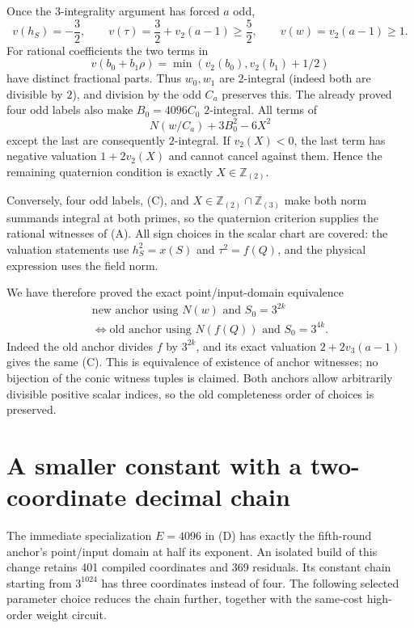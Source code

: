 Once the $3$-integrality argument has forced $a$ odd,
\[
 v(h_S)=-\frac32,\qquad
 v(\tau)=\frac32+v_2(a-1)\ge\frac52,
 \qquad v(w)=v_2(a-1)\ge1.
\]
For rational coefficients the two terms in
\[
 v(b_0+b_1\rho)=\min(v_2(b_0),v_2(b_1)+1/2)
\]
have distinct fractional parts. Thus $w_0,w_1$ are $2$-integral
(indeed both are divisible by $2$), and division by the odd $C_a$
preserves this. The already proved four odd labels also make
$B_0=4096C_0$ $2$-integral. All terms of
\[
 N(w/C_a)+3B_0^2-6X^2
\]
except the last are consequently $2$-integral. If $v_2(X)<0$, the last
term has negative valuation $1+2v_2(X)$ and cannot cancel against them.
Hence the remaining quaternion condition is exactly
$X\in\mathbb Z_{(2)}$.

Conversely, four odd labels, (C), and
$X\in\mathbb Z_{(2)}\cap\mathbb Z_{(3)}$ make both norm summands
integral at both primes, so the quaternion criterion supplies the
rational witnesses of (A). All sign choices in the scalar chart are
covered: the valuation statements use $h_S^2=x(S)$ and $\tau^2=f(Q)$,
and the physical expression uses the field norm.

We have therefore proved the exact point/input-domain equivalence
\[
 \boxed{\begin{gathered}
 \text{new anchor using }N(w)\text{ and }S_0=3^{2k}\\
 \Longleftrightarrow
 \text{old anchor using }N(f(Q))\text{ and }S_0=3^{4k}.
 \end{gathered}}                                      \tag{D}
\]
Indeed the old anchor divides $f$ by $3^{2k}$, and its exact valuation
$2+2v_3(a-1)$ gives the same (C). This is equivalence of existence of
anchor witnesses; no bijection of the conic witness tuples is claimed.
Both anchors allow arbitrarily divisible positive scalar indices, so
the old completeness order of choices is preserved.

\section{A smaller constant with a two-coordinate decimal chain}

The immediate specialization $E=4096$ in (D) has exactly the fifth-round
anchor's point/input domain at half its exponent. An isolated build of
this change retains 401 compiled coordinates and 369 residuals. Its
constant chain starting from $3^{1024}$ has three coordinates instead
of four. The following selected parameter choice reduces the chain
further, together with the same-cost high-order weight circuit.


